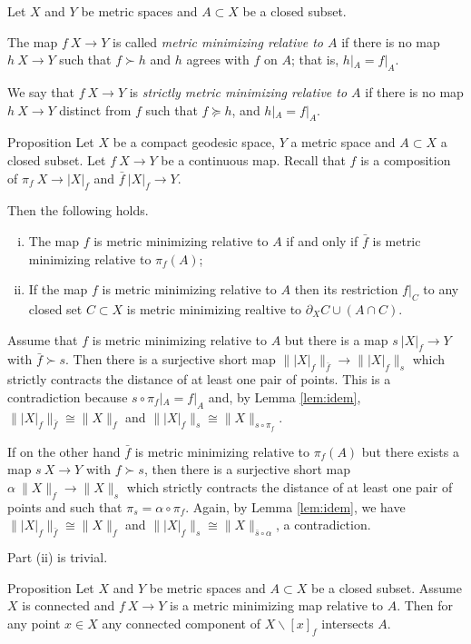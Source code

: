 \documentclass{article}
\begin{document}
Let $X$ and $Y$ be metric spaces and $A\subset X$ be a closed subset.

The map $f\:X\to Y$ is called \emph{metric minimizing relative to $A$}
if there is no map $h\:X\to Y$ such that $f\succ h$
and $h$ agrees with $f$ on $A$;
that is, $h|_A=f|_A$.

We say that $f\:X\to Y$ is \emph{strictly metric minimizing relative to $A$}
if there is no map $h\:X\to Y$ distinct from $f$
such that $f\succcurlyeq h$, 
and $h|_A=f|_A$.

\begin{thm}{Proposition}\label{prop:memicrit}
Let $X$ be a compact geodesic space, $Y$ a metric space 
and $A\subset X$ a closed subset.
Let $f\:X\to Y$ be a continuous map.
Recall that 
$f$ is a composition of $\pi_f\: X\to|X|_f$ and $\bar f\:|X|_f\to Y$.

Then the following holds.
\begin{enumerate}[(i)]
\item The map $f$ is metric minimizing relative to $A$
if and only if $\bar f$ is metric minimizing relative to $\pi_f(A)$;
\item\label{prop:memicrit:retriction} If the map $f$ is metric minimizing relative to $A$ then its restriction
$f|_C$ to any closed set $C\subset X$ is metric minimizing realtive to $\partial_X C\cup (A\cap C)$.
\end{enumerate}

\end{thm}

Assume that $f$ is metric minimizing relative to $A$ but there is a map $s\:|X|_f\to Y$ with $\bar f\succ s$. 
Then there is a surjective short map $\||X|_f\|_{\bar f}\to\||X|_f\|_s$ which strictly
contracts the distance of at least one pair of points.
This is a contradiction because $s\circ\pi_f|_A=f|_A$ and, by Lemma \ref{lem:idem}, 
$\||X|_f\|_{\bar f}\cong\|X\|_f$ and $\||X|_f\|_s\cong\|X\|_{s\circ\pi_f}$. 

If on the other hand $\bar f$ is metric minimizing relative to $\pi_f(A)$ but there exists a map $s\:X\to Y$ with $f\succ s$,
then there is a surjective short map $\alpha\:\|X\|_f\to\|X\|_s$ which strictly
contracts the distance of at least one pair of points and such that $\pi_s=\alpha\circ\pi_f$. 
Again, by Lemma \ref{lem:idem}, we have  $\||X|_f\|_{\bar f}\cong\|X\|_f$ and $\||X|_f\|_s\cong\|X\|_{\bar s\circ\alpha}$, a contradiction. 

Part (ii) is trivial.
\qeds

\begin{thm}{Proposition}\label{prop:point-complement}
Let $X$ and $Y$ be metric spaces and $A\subset X$ be a closed subset.
Assume $X$ is connected and $f\:X\to Y$ is a metric minimizing map relative to $A$.
Then for any point $x\in X$ any connected component of $X\backslash [x]_f$ intersects $A$.

\end{thm}
\end{document}
